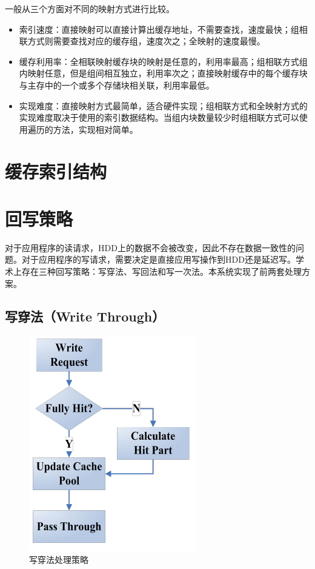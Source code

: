 一般从三个方面对不同的映射方式进行比较。
\begin{itemize}
\item 索引速度：直接映射可以直接计算出缓存地址，不需要查找，速度最快；组相联方式则需要查找对应的缓存组，速度次之；全映射的速度最慢。
\item
缓存利用率：全相联映射缓存块的映射是任意的，利用率最高；组相联方式组内映射任意，但是组间相互独立，利用率次之；直接映射缓存中的每个缓存块与主存中的一个或多个存储块相关联，利用率最低。
\item
实现难度：直接映射方式最简单，适合硬件实现；组相联方式和全映射方式的实现难度取决于使用的索引数据结构。当组内块数量较少时组相联方式可以使用遍历的方法，实现相对简单。
\end{itemize}

\section{缓存索引结构}
\label{sec:cache_indexing}

\section{回写策略}
\label{sec:wb_strategy}

对于应用程序的读请求，HDD上的数据不会被改变，因此不存在数据一致性的问题。对于应用程序的写请求，需要决定是直接应用写操作到HDD还是延迟写。学术上存在三种回写策略：写穿法、写回法和写一次法。本系统实现了前两套处理方案。

\subsection{写穿法（Write Through）}
\begin{figure}[htb]
\centering
\includegraphics[width=0.4\linewidth]{./graph/write-through}
\caption{写穿法处理策略}
\label{fig:write-through}
\end{figure}

